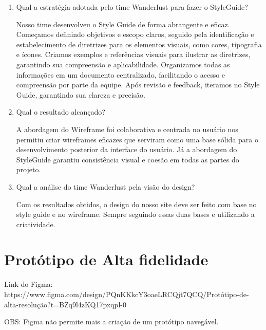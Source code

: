 \documentclass{article}
\begin{document}
\begin{enumerate}
      \item Qual a estratégia adotada pelo time Wanderlust para fazer o StyleGuide?

            Nosso time desenvolveu o Style Guide de forma abrangente e eficaz. Começamos definindo objetivos e escopo claros, seguido pela identificação e estabelecimento de diretrizes para os elementos visuais, como cores, tipografia e ícones. Criamos exemplos e referências visuais para ilustrar as diretrizes, garantindo sua compreensão e aplicabilidade. Organizamos todas as informações em um documento centralizado, facilitando o acesso e compreensão por parte da equipe. Após revisão e feedback, iteramos no Style Guide, garantindo sua clareza e precisão.

      \item Qual o resultado alcançado?

            A abordagem do Wireframe foi colaborativa e centrada no usuário nos permitiu criar wireframes eficazes que serviram como uma base sólida para o desenvolvimento posterior da interface do usuário. Já a abordagem do StyleGuide garantiu consistência visual e coesão em todas as partes do projeto.

      \item Qual a análise do time Wanderlust pela visão do design?

            Com os resultados obtidos, o design do nosso site deve ser feito com base no style guide e no wireframe. Sempre seguindo essas duas bases e utilizando a criatividade.

\end{enumerate}

\section{Protótipo de Alta fidelidade}
Link do Figma: https://www.figma.com/design/PQnKKkcY3oaeLRCQjt7QCQ/Protótipo-de-alta-resolução?t=BZq9l4zKQ17pxqpl-0

\bigskip

OBS: Figma não permite mais a criação de um protótipo navegável.
\end{document}

